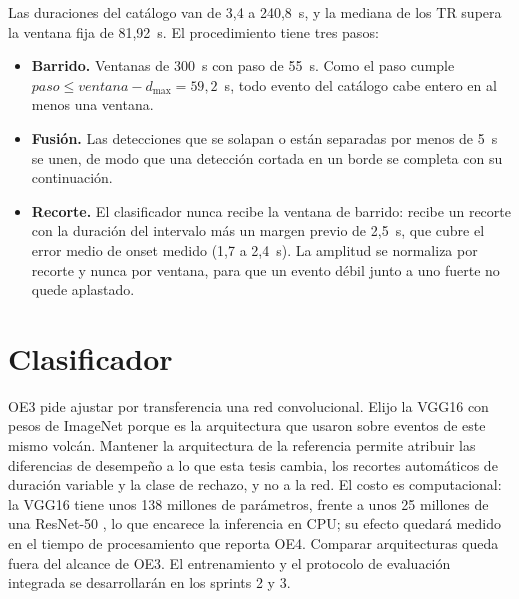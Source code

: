 \documentclass[12pt,oneside,spanish,oldfontcommands]{memoir}
\begin{document}
Las duraciones del catálogo van de 3,4 a 240,8~s, y la mediana de los TR
supera la ventana fija de 81,92~s. El procedimiento tiene tres pasos:

\begin{itemize}
\item \textbf{Barrido.} Ventanas de 300~s con paso de 55~s. Como el paso
cumple $paso \leq ventana - d_{\max} = 59{,}2$~s, todo evento del catálogo
cabe entero en al menos una ventana.
\item \textbf{Fusión.} Las detecciones que se solapan o están separadas por
menos de 5~s se unen, de modo que una detección cortada en un borde se
completa con su continuación.
\item \textbf{Recorte.} El clasificador nunca recibe la ventana de barrido:
recibe un recorte con la duración del intervalo más un margen previo de
2,5~s, que cubre el error medio de onset medido (1,7 a 2,4~s). La amplitud se normaliza por
recorte y nunca por ventana, para que un evento débil junto a uno fuerte no
quede aplastado.
\end{itemize}

\section{Clasificador}
\label{sec:clasificador-transferencia}

OE3 pide ajustar por transferencia una red convolucional. Elijo la VGG16
\parencite{simonyan2015vgg} con pesos de ImageNet porque es la arquitectura
que \textcite{espinosacurilem2025ood} usaron sobre eventos de este mismo
volcán. Mantener la arquitectura de la referencia permite atribuir las
diferencias de desempeño a lo que esta tesis cambia, los recortes
automáticos de duración variable y la clase de rechazo, y no a la red. El
costo es computacional: la VGG16 tiene unos 138 millones de parámetros,
frente a unos 25 millones de una ResNet-50 \parencite{he2016resnet}, lo que
encarece la inferencia en CPU; su efecto quedará medido en el tiempo de
procesamiento que reporta OE4. Comparar arquitecturas queda fuera del
alcance de OE3. El entrenamiento y el protocolo de evaluación integrada se
desarrollarán en los sprints 2 y 3.

\end{document}
